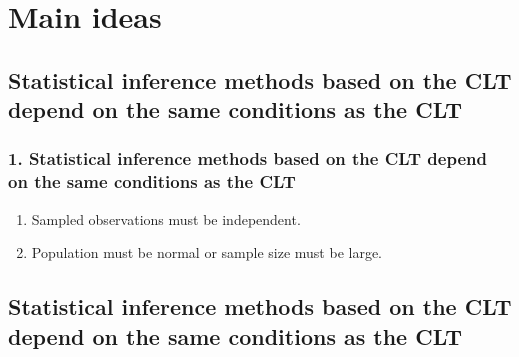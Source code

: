 \documentclass[slidestop,compress,mathserif,12pt,t,professionalfonts,xcolor=table]{beamer}
\begin{document}

\section{Main ideas}

\subsection{Statistical inference methods based on the CLT depend on the same conditions as the CLT}
\label{mi1}


\begin{frame}
\frametitle{1. Statistical inference methods based on the CLT depend on the same conditions as the CLT}


\begin{enumerate}


\item {} Sampled observations must be independent. \\

\item {} Population must be normal or sample size must be
  large.

\end{enumerate}

\end{frame}


\subsection{Statistical inference methods based on the CLT depend on the same conditions as the CLT}
\label{mi1}


\end{document}
